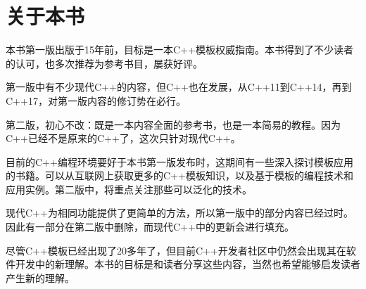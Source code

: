\chapter{关于本书}

本书第一版出版于15年前，目标是一本C++模板权威指南。本书得到了不少读者的认可，也多次推荐为参考书目，屡获好评。

第一版中有不少现代C++的内容，但C++也在发展，从C++11到C++14，再到C++17，对第一版内容的修订势在必行。

第二版，初心不改：既是一本内容全面的参考书，也是一本简易的教程。因为C++已经不是原来的C++了，这次只针对现代C++。

目前的C++编程环境要好于本书第一版发布时，这期间有一些深入探讨模板应用的书籍。可以从互联网上获取更多的C++模板知识，以及基于模板的编程技术和应用实例。第二版中，将重点关注那些可以泛化的技术。

现代C++为相同功能提供了更简单的方法，所以第一版中的部分内容已经过时。因此有一部分在第二版中删除，而现代C++中的更新会进行填充。

尽管C++模板已经出现了20多年了，但目前C++开发者社区中仍然会出现其在软件开发中的新理解。本书的目标是和读者分享这些内容，当然也希望能够启发读者产生新的理解。